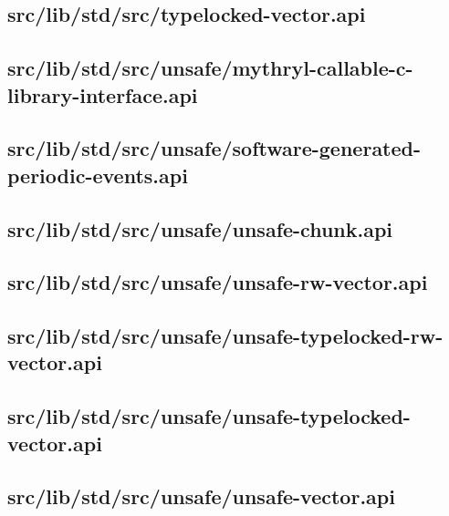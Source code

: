 \subsection{src/lib/std/src/typelocked-vector.api}


\subsection{src/lib/std/src/unsafe/mythryl-callable-c-library-interface.api}


\subsection{src/lib/std/src/unsafe/software-generated-periodic-events.api}


\subsection{src/lib/std/src/unsafe/unsafe-chunk.api}


\subsection{src/lib/std/src/unsafe/unsafe-rw-vector.api}


\subsection{src/lib/std/src/unsafe/unsafe-typelocked-rw-vector.api}


\subsection{src/lib/std/src/unsafe/unsafe-typelocked-vector.api}


\subsection{src/lib/std/src/unsafe/unsafe-vector.api}


